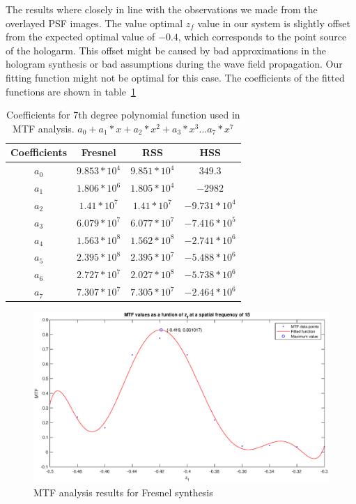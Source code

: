 \documentclass[12pt,a4paper,english
]{tunithesis}
\begin{document}
The results where closely in line with the observations we made from the overlayed PSF images. The value optimal $z_f$ value in our system is slightly offset from the expected optimal value of $-0.4$, which corresponds to the point source of the hologarm. This offset might be caused by bad approximations in the hologram synthesis or bad assumptions during the wave field propagation. Our fitting function might not be optimal for this case. The coefficients of the fitted functions are shown in table~\ref{tab:coeffs}

\begin{table}
  \centering
  \label{tab:coeffs}
  \caption{Coefficients for 7th degree polynomial function used in MTF analysis. $a_0 + a_1*x + a_2*x^2 + a_3*x^3 ... a_7*x^7$}
\begin{tabular}{|c|c|c|c|}
  \hline
  Coefficients & Fresnel & RSS & HSS \\ \hline
  $a_0$ & $9.853*10^4$ & $9.851*10^4$ & $349.3$ \\\hline
  $a_1$ & $1.806*10^6$ & $1.805*10^4$ & $-2982$ \\\hline
  $a_2$ & $1.41*10^7$ & $1.41*10^7$ & $-9.731*10^4$ \\\hline
  $a_3$ & $6.079*10^7$ & $6.077*10^7$ & $-7.416*10^5$ \\\hline
  $a_4$ & $1.563*10^8$ & $1.562*10^8$ & $-2.741*10^6$ \\\hline
  $a_5$ & $2.395*10^8$ & $2.395*10^7$ & $-5.488*10^6$ \\\hline
  $a_6$ & $2.727*10^7$ & $2.027*10^8$ & $-5.738*10^6$ \\\hline
  $a_7$ & $7.307*10^7$ & $7.305*10^7$ & $-2.464*10^6$ \\
  \hline
\end{tabular}
\end{table}




\begin{figure}
  \centering
  \includegraphics[width=\columnwidth]{img/mtf_fresnel.eps}
  \caption{MTF analysis results for Fresnel synthesis}
  \label{fig:mtf_fresnel}
\end{figure}
\end{document}

